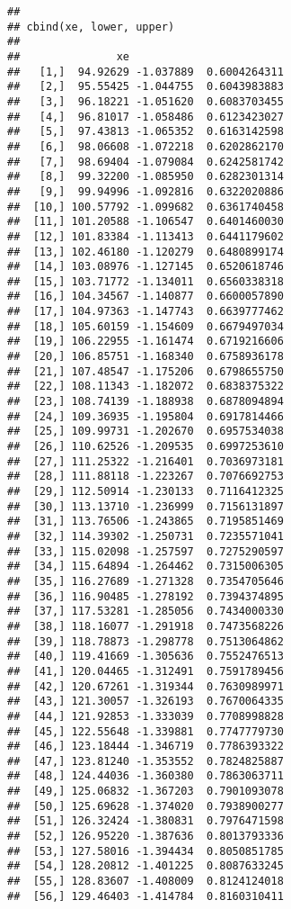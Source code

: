 \documentclass[]{book}
\theoremstyle{definition}
\theoremstyle{definition}
\theoremstyle{definition}
\theoremstyle{remark}
\begin{document}
\begin{verbatim}
## 
## cbind(xe, lower, upper)
## 
##               xe                        
##   [1,]  94.92629 -1.037889  0.6004264311
##   [2,]  95.55425 -1.044755  0.6043983883
##   [3,]  96.18221 -1.051620  0.6083703455
##   [4,]  96.81017 -1.058486  0.6123423027
##   [5,]  97.43813 -1.065352  0.6163142598
##   [6,]  98.06608 -1.072218  0.6202862170
##   [7,]  98.69404 -1.079084  0.6242581742
##   [8,]  99.32200 -1.085950  0.6282301314
##   [9,]  99.94996 -1.092816  0.6322020886
##  [10,] 100.57792 -1.099682  0.6361740458
##  [11,] 101.20588 -1.106547  0.6401460030
##  [12,] 101.83384 -1.113413  0.6441179602
##  [13,] 102.46180 -1.120279  0.6480899174
##  [14,] 103.08976 -1.127145  0.6520618746
##  [15,] 103.71772 -1.134011  0.6560338318
##  [16,] 104.34567 -1.140877  0.6600057890
##  [17,] 104.97363 -1.147743  0.6639777462
##  [18,] 105.60159 -1.154609  0.6679497034
##  [19,] 106.22955 -1.161474  0.6719216606
##  [20,] 106.85751 -1.168340  0.6758936178
##  [21,] 107.48547 -1.175206  0.6798655750
##  [22,] 108.11343 -1.182072  0.6838375322
##  [23,] 108.74139 -1.188938  0.6878094894
##  [24,] 109.36935 -1.195804  0.6917814466
##  [25,] 109.99731 -1.202670  0.6957534038
##  [26,] 110.62526 -1.209535  0.6997253610
##  [27,] 111.25322 -1.216401  0.7036973181
##  [28,] 111.88118 -1.223267  0.7076692753
##  [29,] 112.50914 -1.230133  0.7116412325
##  [30,] 113.13710 -1.236999  0.7156131897
##  [31,] 113.76506 -1.243865  0.7195851469
##  [32,] 114.39302 -1.250731  0.7235571041
##  [33,] 115.02098 -1.257597  0.7275290597
##  [34,] 115.64894 -1.264462  0.7315006305
##  [35,] 116.27689 -1.271328  0.7354705646
##  [36,] 116.90485 -1.278192  0.7394374895
##  [37,] 117.53281 -1.285056  0.7434000330
##  [38,] 118.16077 -1.291918  0.7473568226
##  [39,] 118.78873 -1.298778  0.7513064862
##  [40,] 119.41669 -1.305636  0.7552476513
##  [41,] 120.04465 -1.312491  0.7591789456
##  [42,] 120.67261 -1.319344  0.7630989971
##  [43,] 121.30057 -1.326193  0.7670064335
##  [44,] 121.92853 -1.333039  0.7708998828
##  [45,] 122.55648 -1.339881  0.7747779730
##  [46,] 123.18444 -1.346719  0.7786393322
##  [47,] 123.81240 -1.353552  0.7824825887
##  [48,] 124.44036 -1.360380  0.7863063711
##  [49,] 125.06832 -1.367203  0.7901093078
##  [50,] 125.69628 -1.374020  0.7938900277
##  [51,] 126.32424 -1.380831  0.7976471598
##  [52,] 126.95220 -1.387636  0.8013793336
##  [53,] 127.58016 -1.394434  0.8050851785
##  [54,] 128.20812 -1.401225  0.8087633245
##  [55,] 128.83607 -1.408009  0.8124124018
##  [56,] 129.46403 -1.414784  0.8160310411

\end{verbatim}
\end{document}
